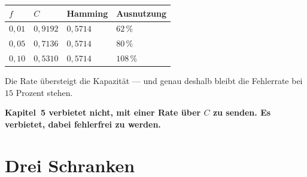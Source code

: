 \begin{warnung}
\begin{center}
{\small
\renewcommand{\arraystretch}{1.48}
\begin{tabular}{@{}P{1.4cm}P{1.8cm}P{2.0cm}P{2.4cm}@{}}
\toprule
$f$ & $C$ & \textbf{Hamming} & \textbf{Ausnutzung}\\
\midrule
$0{,}01$ & $0{,}9192$ & $0{,}5714$ & $62\,\%$\\
$0{,}05$ & $0{,}7136$ & $0{,}5714$ & $80\,\%$\\
$0{,}10$ & $0{,}5310$ & $0{,}5714$ & \textcolor{akzent}{$108\,\%$}\\
\bottomrule
\end{tabular}}
\end{center}

Die Rate übersteigt die Kapazität --- und genau deshalb bleibt die Fehlerrate bei $15$ Prozent stehen.

\begin{center}
\begin{minipage}{0.9\textwidth}
\textbf{Kapitel~5 verbietet nicht, mit einer Rate über $C$ zu senden. Es verbietet, dabei fehlerfrei zu werden.}
\end{minipage}
\end{center}

\begin{center}
\begin{minipage}{0.88\textwidth}
\end{minipage}
\end{center}
\end{warnung}

\section{Drei Schranken}

